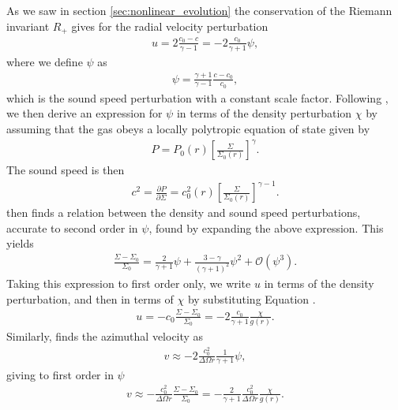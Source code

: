 As we saw in section \ref{sec:nonlinear_evolution} the conservation of the Riemann invariant $R_+$ gives for the radial velocity perturbation
\begin{align}
    u = 2\frac{c_0-c}{\gamma - 1}=-2\frac{c_0}{\gamma + 1} \psi, \label{eq:u_rafikov}
\end{align}
where we define $\psi$ as
\begin{align}
    \psi = \frac{\gamma+1}{\gamma-1} \frac{c - c_0}{c_0},
\end{align}
which is the sound speed perturbation with a constant scale factor. Following \citet{rafikov2002a}, we then derive an expression for $\psi$ in terms of the density perturbation $\chi$ by assuming that the gas obeys a locally polytropic equation of state given by 
\begin{align}
    P = P_0(r) \left[ \frac{\Sigma}{\Sigma_0(r)} \right]^\gamma. \label{eq:poly_EOS}
\end{align}
The sound speed is then
\begin{align}
    c^2 = \frac{\partial P}{\partial \Sigma} = c_0^2(r) \left[ \frac{\Sigma}{\Sigma_0(r)} \right]^{\gamma-1}.
\end{align}
\citet{rafikov2002a} then finds a relation between the density and sound speed perturbations, accurate to second order in $\psi$, found by expanding the above expression. 
This yields
\begin{align}
    \frac{\Sigma - \Sigma_0}{\Sigma_0} = \frac{2}{\gamma + 1}\psi + \frac{3 - \gamma}{\left( \gamma + 1  \right)^2} \psi^2 + \mathcal{O}(\psi^3). \label{eq:psi_exp}
\end{align}
Taking this expression to first order only, we write $u$ in terms of the density perturbation, and then in terms of $\chi$ by substituting Equation \feqr. 
\begin{align}
    u = - c_0 \frac{\Sigma - \Sigma_0}{\Sigma_0} = -2 \frac{c_0}{\gamma + 1} \frac{\chi}{g(r)}. \label{eq:ap_rad_vel}
\end{align}
Similarly, \citet{rafikov2002a} finds the azimuthal velocity as
\begin{align}
    v \approx -2 \frac{c_0^2}{\Delta\Omega r} \frac{1}{\gamma + 1} \psi, \label{eq:v_rafikov}
\end{align}
giving to first order in $\psi$
\begin{align}
    v \approx - \frac{c_0^2}{\Delta \Omega r} \frac{\Sigma - \Sigma_0}{\Sigma_0} = - \frac{2}{\gamma + 1} \frac{c_0^2}{\Delta \Omega r} \frac{\chi}{g(r)}. \label{eq:ap_az_vel}
\end{align}
